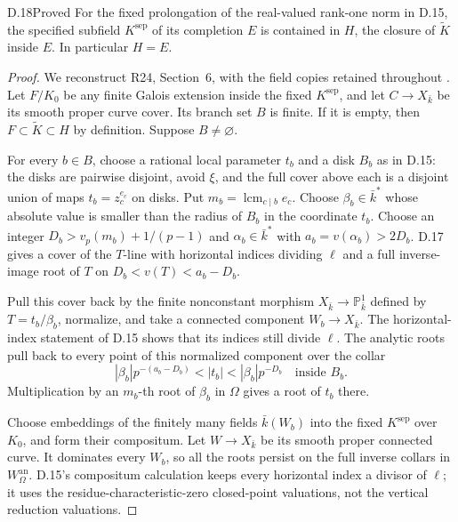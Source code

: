 \begin{claim}{D.18}{Proved}\label{clm:D18}
For the fixed prolongation of the real-valued rank-one norm in
D.15, the specified subfield $K^{\mathrm{sep}}$ of its completion
$E$ is contained in $H$, the closure of $\widetilde K$ inside
$E$. In particular $H=E$.
\end{claim}
\begin{proof}
We reconstruct R24, Section~6, with the field copies retained
throughout \citep{D_OpenAI2026}.
Let $F/K_0$ be any finite Galois extension inside the fixed
$K^{\mathrm{sep}}$, and let $C\to X_{\bar k}$ be its smooth
proper curve cover. Its branch set $B$ is finite. If it is
empty, then $F\subset\widetilde K\subset H$ by definition.
Suppose $B\ne\varnothing$.

For every $b\in B$, choose a rational local parameter $t_b$
and a disk $B_b$ as in D.15: the disks are pairwise disjoint,
avoid $\xi$, and the full cover above each is a disjoint union
of maps $t_b=z_c^{e_c}$ on disks. Put
$m_b=\operatorname{lcm}_{c\mid b}e_c$.
Choose $\beta_b\in\bar k^*$ whose absolute value is smaller
than the radius of $B_b$ in the coordinate $t_b$.
Choose an integer
$D_b>v_p(m_b)+1/(p-1)$ and
$\alpha_b\in\bar k^*$ with $a_b=v(\alpha_b)>2D_b$.
D.17 gives a cover of the $T$-line with horizontal indices
dividing $\ell$ and a full inverse-image root of $T$ on
$D_b<v(T)<a_b-D_b$.

Pull this cover back by the finite nonconstant morphism
$X_{\bar k}\to\mathbb P^1_{\bar k}$ defined by
$T=t_b/\beta_b$, normalize, and take a connected component
$W_b\to X_{\bar k}$.
The horizontal-index statement of D.15 shows that its indices
still divide $\ell$. The analytic roots pull back to every
point of this normalized component over the collar
\[
 |\beta_b|p^{-(a_b-D_b)}<|t_b|<|\beta_b|p^{-D_b}
                         \quad\text{inside }B_b.
\]
Multiplication by an $m_b$-th root of $\beta_b$ in $\Omega$
gives a root of $t_b$ there.

Choose embeddings of the finitely many fields $\bar k(W_b)$
into the fixed $K^{\mathrm{sep}}$ over $K_0$, and form their
compositum. Let $W\to X_{\bar k}$ be its smooth proper
connected curve. It dominates every $W_b$, so all the roots
persist on the full inverse collars in $W_\Omega^{\mathrm{an}}$.
D.15's compositum calculation keeps every horizontal index a
divisor of $\ell$; it uses the residue-characteristic-zero
closed-point valuations, not the vertical reduction valuations.


\end{proof}
